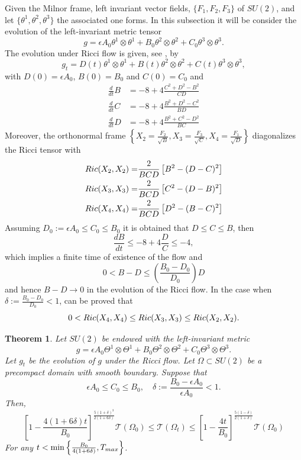 \documentclass{amsart}
\newtheorem{theorem}{Theorem}[section]
\theoremstyle{definition}
\theoremstyle{remark}
\begin{document}
Given  the Milnor frame, left invariant vector fields, $\{F_1,F_2,F_3\}$   of $SU(2)$, and let $\{\theta^1,\theta^2, \theta^3\}$ the associated one forms. In this subsection it will be consider the evolution of the left-invariant metric tensor 
$$
g=\epsilon A_0 \theta^1\otimes\theta^1+B_0 \theta^2\otimes\theta^2+C_0\theta^3\otimes\theta^3.
$$
The evolution under Ricci flow is given, see \cite{ChowLiNi}, by
$$
g_t=D(t) \theta^1\otimes\theta^1+B(t) \theta^2\otimes\theta^2+C(t)\theta^3\otimes\theta^3,
$$
with  $D(0)=\epsilon A_0$, $B(0)=B_0$ and $C(0)=C_0$ and
$$
\begin{aligned}
    \frac{d}{dt}B&= -8+4\frac{C^2+D^2-B^2}{CD}\\
    \frac{d}{dt}C&= -8+4\frac{B^2+D^2-C^2}{BD}\\
    \frac{d}{dt}D&= -8+4\frac{B^2+C^2-D^2}{BC}
\end{aligned}
$$
Moreover, the orthonormal frame $\displaystyle\left\{X_2=\frac{F_2}{\sqrt{B}},X_3=\frac{F_3}{\sqrt{C}}, X_4=\frac{F_1}{\sqrt{D}} \right\}$ diagonalizes the Ricci tensor with
$$
\begin{aligned}
    {\rm Ric}(X_2,X_2)=&\frac{2}{BCD}\left[B^2-(D-C)^2\right]\\
    {\rm Ric}(X_3,X_3)=&\frac{2}{BCD}\left[C^2-(D-B)^2\right]\\
    {\rm Ric}(X_4,X_4)=&\frac{2}{BCD}\left[D^2-(B-C)^2\right]
\end{aligned}
$$
 Assuming  $D_0:=\epsilon A_0\leq C_0\leq B_0$ it is obtained that $D\leq C\leq B$, then
 \begin{equation}\label{ode:1}
\frac{d B}{dt}\leq -8+4\frac{D}{C}\leq -4,     
 \end{equation}
which implies a finite time of existence of the flow and 
 $$
0<B-D\leq \left(\frac{B_0-D_0}{D_0}\right)D
 $$
 and hence $B-D\rightarrow 0$ in the evolution of the Ricci flow.  In the case when $\delta:=\frac{B_0-D_0}{D_0}<1$, can be proved that
 $$
0<  {\rm Ric}(X_4,X_4)\leq   {\rm Ric}(X_3,X_3)\leq   {\rm Ric}(X_2,X_2).
 $$
 \begin{theorem}
    Let $SU(2)$ be endowed with the left-invariant metric 
    $$
g=\epsilon A_0 \Theta^1\otimes\Theta^1+B_0 \Theta^2\otimes\Theta^2+C_0\Theta^3\otimes\Theta^3.
$$
Let $g_t$ be the evolution of $g$ under the Ricci flow. Let $\Omega\subset SU(2)$ be a precompact domain with smooth boundary. Suppose that 
$$
\epsilon A_0\leq C_0\leq B_0,\quad \delta:=\frac{B_0-\epsilon A_0}{\epsilon A_0}<1.
$$
Then,
$$
\left[1-\frac{4(1+6\delta)t}{B_0}\right]^{\frac{5(1+\delta)^3}{2(1+6\delta)}}\mathcal{T}(\Omega_0)\leq \mathcal{T}(\Omega_t)\leq \left[1-\frac{4t}{B_0}\right]^{\frac{5(1-\delta)}{2(1+\delta)}}\mathcal{T}(\Omega_0)
$$
For any $t<\min\left\{\frac{B_0}{4(1+6\delta)},T_{\rm max}\right\}$.
\end{theorem}
\end{document}
